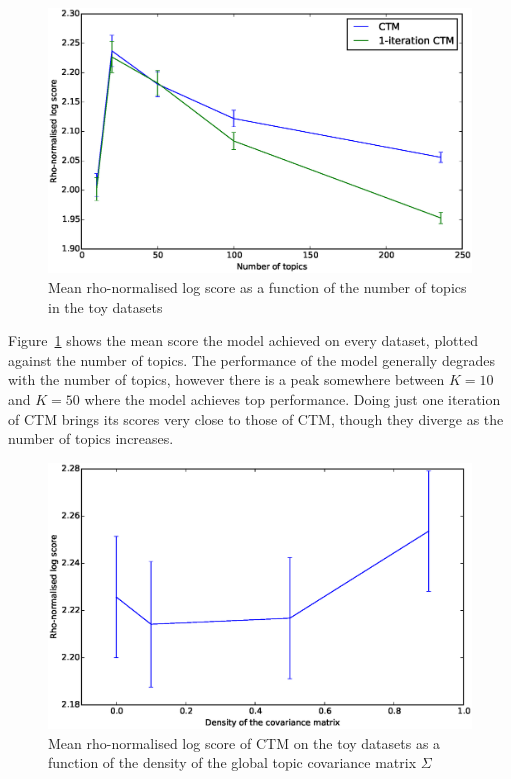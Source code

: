 \documentclass[12pt,a4paper,twoside,openright]{report}
\begin{document}
\begin{figure}[!htb]
\includegraphics[width=\textwidth]{sim-average-rho.eps}
\caption{Mean rho-normalised log score as a function of the number of topics in the toy datasets}
\label{fig:sim-average-rho}
\end{figure}

Figure~\ref{fig:sim-average-rho} shows the mean score the model achieved on every dataset, plotted against the number of topics. The performance of the model generally degrades with the number of topics, however there is a peak somewhere between $K=10$ and $K=50$ where the model achieves top performance. Doing just one iteration of CTM brings its scores very close to those of CTM, though they diverge as the number of topics increases.

\begin{figure}[!htb]
\includegraphics[width=\textwidth]{sim-sigmadensity-rho.eps}
\caption{Mean rho-normalised log score of CTM on the toy datasets as a function of the density of the global topic covariance matrix $\Sigma$}
\label{fig:sim-sigmadensity-rho}
\end{figure}
\end{document}
